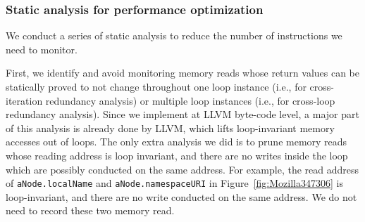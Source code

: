 



\subsubsection{Static analysis for performance optimization}
\label{sec:perf}

We conduct a series of static analysis to reduce the number of instructions we 
need to monitor. 

First, we identify and avoid monitoring memory reads whose return values can be 
statically proved to
not change throughout one loop instance (i.e., for cross-iteration
redundancy analysis) or multiple loop instances (i.e., for cross-loop redundancy
analysis). Since we implement \Tool at LLVM byte-code level, a major part of this
analysis is already done by LLVM, which lifts loop-invariant memory
accesses out of loops. The only extra analysis we did is to 
prune memory reads whose reading address is loop invariant, and there are no writes 
inside the loop which are possibly conducted on the same address. 
For example, the read address of \texttt{aNode.localName} and \texttt{aNode.namespaceURI}
in Figure~\ref{fig:Mozilla347306} is loop-invariant, and there are no write conducted 
on the same address. We do not need to record these two memory read. 

